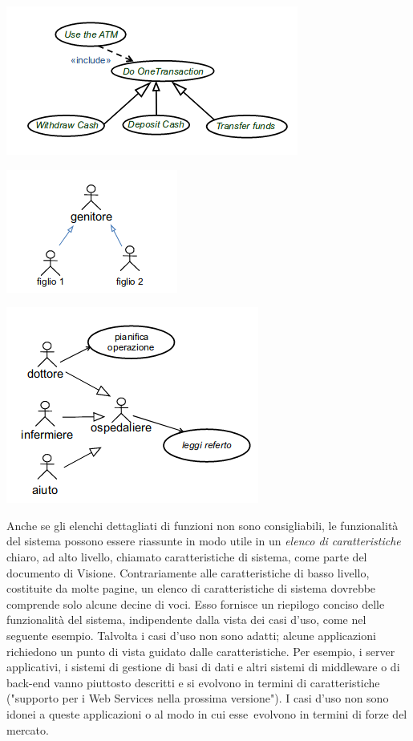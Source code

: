 \documentclass[a4paper,12pt, oneside]{book}
\begin{document}
\begin{itemize}
\begin{center}
		\includegraphics[scale=0.7]{img/gend2.png}
	\end{center}\begin{center}
		\includegraphics[scale=0.7]{img/gend3.png}
	\end{center}\begin{center}
		\includegraphics[scale=0.7]{img/gend4.png}
	\end{center}
	
\end{itemize}
\begin{shaded}
Anche se gli elenchi dettagliati di funzioni non sono consigliabili, le funzionalità del
sistema possono essere riassunte in modo utile in un \textit{elenco di caratteristiche} chiaro, ad
alto livello, chiamato caratteristiche di sistema, come parte del documento di Visione. Contrariamente alle caratteristiche di basso livello, costituite da molte pagine, un elenco di caratteristiche di sistema dovrebbe comprende solo alcune decine di voci. Esso fornisce un riepilogo conciso delle funzionalità del sistema, indipendente dalla vista dei casi d'uso, come nel seguente esempio. Talvolta i casi d'uso non sono adatti; alcune applicazioni richiedono un punto di vista guidato dalle caratteristiche. Per esempio, i server applicativi, i sistemi di gestione di basi di dati e altri sistemi di middleware o di back-end vanno piuttosto descritti e si evolvono in termini di caratteristiche ("supporto per i Web Services nella prossima versione"). I casi d'uso non sono idonei a queste applicazioni o al modo in cui esse~evolvono in termini di forze del mercato.
\end{shaded}
\end{document}
